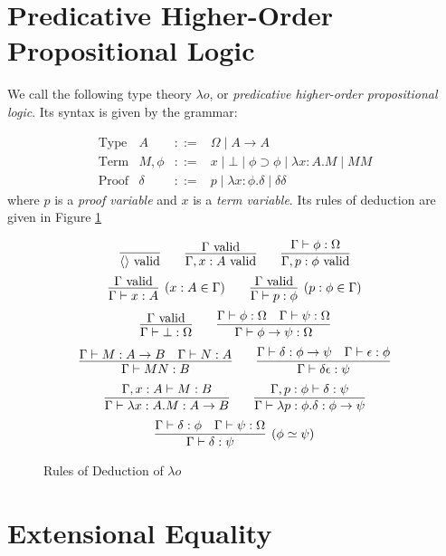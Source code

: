 
\section{Predicative Higher-Order Propositional Logic}

We call the following type theory $\lambda o$, or \emph{predicative higher-order propositional logic}.  Its
syntax is given by the grammar:

\[
\begin{array}{lrcl}
\text{Type} & A & ::= & \Omega \mid A \rightarrow A \\
\text{Term} & M, \phi & ::= & x \mid \bot \mid \phi \supset\phi \mid \lambda x:A.M \mid MM \\
\text{Proof} & \delta & ::= & p \mid \lambda x:\phi.\delta \mid \delta \delta
\end{array}
\]
where $p$ is a \emph{proof variable} and $x$ is a \emph{term variable}.
Its rules of deduction are given in Figure \ref{fig:lambdao}

\begin{figure}
\begin{framed}
\[ \infer{\langle \rangle \vald}{} \qquad
\infer{\Gamma, x : A \vald}{\Gamma \vald} \qquad 
\infer{\Gamma, p : \phi \vald}{\Gamma \vdash \phi : \Omega} \]
\[ \infer[(x : A \in \Gamma)]{\Gamma \vdash x : A}{\Gamma \vald} \qquad
\infer[(p : \phi \in \Gamma)]{\Gamma \vdash p : \phi}{\Gamma \vald} \]
\[ \infer{\Gamma \vdash \bot : \Omega}{\Gamma \vald} \qquad
\infer{\Gamma \vdash \phi \rightarrow \psi : \Omega}{\Gamma \vdash \phi : \Omega \quad \Gamma \vdash \psi : \Omega} \]
\[ \infer{\Gamma \vdash M N : B} {\Gamma \vdash M : A \rightarrow B \quad \Gamma \vdash N : A} \qquad
\infer{\Gamma \vdash \delta \epsilon : \psi} {\Gamma \vdash \delta : \phi \rightarrow \psi \quad \Gamma \vdash \epsilon : \phi} \]
\[ \infer{\Gamma \vdash \lambda x:A.M : A \rightarrow B}{\Gamma, x : A \vdash M : B} \qquad
\infer{\Gamma \vdash \lambda p : \phi . \delta : \phi \rightarrow \psi}{\Gamma, p : \phi \vdash \delta : \psi} \]
\[ \infer[(\phi \simeq \psi)]{\Gamma \vdash \delta : \psi}{\Gamma \vdash \delta : \phi \quad \Gamma \vdash \psi : \Omega} \]
\end{framed}
\caption{Rules of Deduction of $\lambda o$}
\label{fig:lambdao}
\end{figure}

\section{Extensional Equality}

